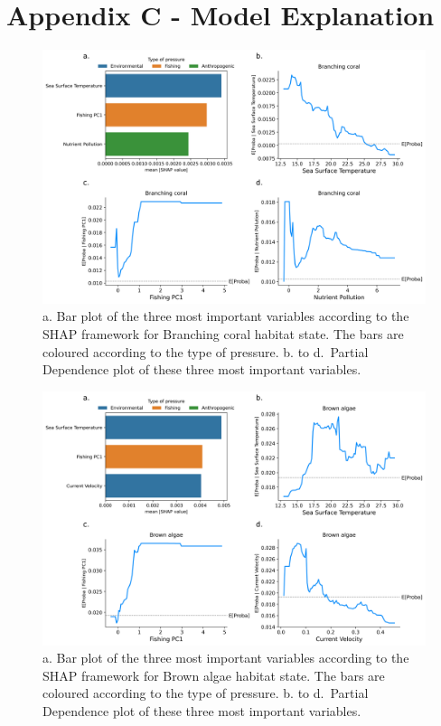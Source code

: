 \hypertarget{appendixC-chapter3}{%
\section*{Appendix C - Model Explanation}\label{appendixC-chapter3}}

\begin{figure}
\hypertarget{fig:chap3figS36}{%
\centering
\includegraphics{03-Chapitre3/figures/supplementary/04-pdp_Branching coral.png}
\caption{a. Bar plot of the three most important variables according to
the SHAP framework for Branching coral habitat state. The bars are
coloured according to the type of pressure. b. to d.~Partial Dependence
plot of these three most important variables.}\label{fig:chap3figS36}
}
\end{figure}

\begin{figure}
\hypertarget{fig:chap3figS37}{%
\centering
\includegraphics{03-Chapitre3/figures/supplementary/04-pdp_Brown algae.png}
\caption{a. Bar plot of the three most important variables according to
the SHAP framework for Brown algae habitat state. The bars are coloured
according to the type of pressure. b. to d.~Partial Dependence plot of
these three most important variables.}\label{fig:chap3figS37}
}
\end{figure}

